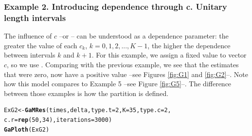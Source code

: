 \documentclass[letterpaper]{article}\usepackage[]{graphicx}\usepackage[]{xcolor}
\makeatletter
\newcommand{\hlnum}[1]{\textcolor[rgb]{0.686,0.059,0.569}{#1}}%
\newcommand{\hlstd}[1]{\textcolor[rgb]{0.345,0.345,0.345}{#1}}%
\newcommand{\hlkwb}[1]{\textcolor[rgb]{0.69,0.353,0.396}{#1}}%
\newcommand{\hlkwc}[1]{\textcolor[rgb]{0.333,0.667,0.333}{#1}}%
\newcommand{\hlkwd}[1]{\textcolor[rgb]{0.737,0.353,0.396}{\textbf{#1}}}%
\newenvironment{kframe}{%
 \def\at@end@of@kframe{}%
 \ifinner\ifhmode%
  \def\at@end@of@kframe{\end{minipage}}%
  \begin{minipage}{\columnwidth}%
 \fi\fi%
 \def\FrameCommand##1{\hskip\@totalleftmargin \hskip-\fboxsep
 \colorbox{shadecolor}{##1}\hskip-\fboxsep
     \hskip-\linewidth \hskip-\@totalleftmargin \hskip\columnwidth}%
 \MakeFramed {\advance\hsize-\width
   \@totalleftmargin\z@ \linewidth\hsize
   \@setminipage}}%
 {\par\unskip\endMakeFramed%
 \at@end@of@kframe}
\newenvironment{knitrout}{}{} %
\makeatother
\begin{document}
\subsubsection{Example 2. Introducing dependence through c. Unitary length intervals}

The influence of $c$ --or -- can be understood as a dependence parameter: the greater the value of each $c_k$, $k=0,1,2,...,K-1$, the higher the dependence between intervals $k$ and $k+1$. For this example, we assign a fixed value to vector $c$, so we use . Comparing with the previous example, we see that the estimates that were zero, now have a positive value --see Figures \ref{fig:G1} and \ref{fig:G2}--. Note  how this model compares to Example 5 --see Figure \ref{fig:G5}--. The difference between those examples is how the partition is defined.

\begin{knitrout}
\color{fgcolor}\begin{kframe}
\begin{alltt}
\hlstd{ExG2} \hlkwb{<-} \hlkwd{GaMRes}\hlstd{(times, delta,} \hlkwc{type.t} \hlstd{=} \hlnum{2}\hlstd{,} \hlkwc{K} \hlstd{=} \hlnum{35}\hlstd{,} \hlkwc{type.c} \hlstd{=} \hlnum{2}\hlstd{,}
               \hlkwc{c.r} \hlstd{=} \hlkwd{rep}\hlstd{(}\hlnum{50}\hlstd{,} \hlnum{34}\hlstd{),} \hlkwc{iterations} \hlstd{=} \hlnum{3000}\hlstd{)}
\hlkwd{GaPloth}\hlstd{(ExG2)}
\end{alltt}
\end{kframe}
\end{knitrout}
\end{document}
